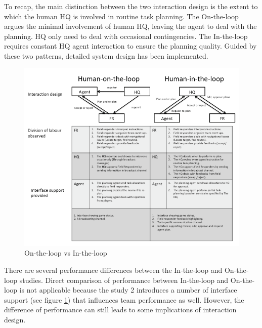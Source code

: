 To recap, the main distinction between the two interaction design is the extent to which the human HQ is involved in routine task planning. The On-the-loop  argues the minimal involvement of human HQ, leaving the agent to deal with the planning. HQ only need to deal with occasional contingencies. The In-the-loop requires constant HQ agent interaction to ensure the planning quality. Guided by these two patterns, detailed system design has been implemented.\\

\begin{figure}[h]
  \centering
  \includegraphics[width=1\textwidth]{img/conclusion/huilvshuol}
  \caption{On-the-loop vs In-the-loop}
  \label{fig:huilvshuol}
\end{figure}


There are several performance differences between the In-the-loop and On-the-loop studies. Direct comparison of performance between In-the-loop and On-the-loop is not applicable because the study 2 introduces a number of interface support (see figure \ref{fig:huilvshuol}) that influences team performance as well. However, the difference of performance can still leads to some implications of interaction design.\\

